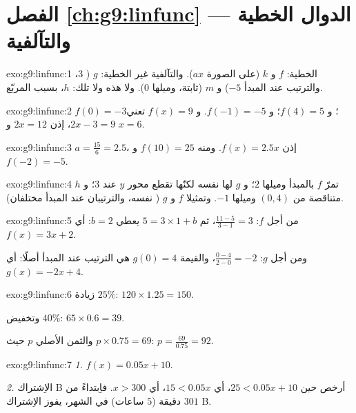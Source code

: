 \section*{الفصل \ref{ch:g9:linfunc} --- الدوال الخطية والتآلفية}

\begin{solution}{exo:g9:linfunc:1}
الخطية: $f$ و $k$ (على الصورة $ax$). والتآلفية غير الخطية: $g$
( $3$، والترتيب عند المبدأ $-5$) و $m$ (ثابتة،
وميلها $0$). ولا هذه ولا تلك: $h$، بسبب المربّع.
\end{solution}

\begin{solution}{exo:g9:linfunc:2}
$f(0) = -3$؛ و $f(4) = 5$؛ و $f(-1) = -5$. و $f(x) = 9$ تعني
$2x - 3 = 9$، إذن $2x = 12$ و $x = 6$.
\end{solution}

\begin{solution}{exo:g9:linfunc:3}
$a = \frac{15}{6} = 2.5$، إذن $f(x) = 2.5x$. ومنه $f(10) = 25$
و $f(-2) = -5$.
\end{solution}

\begin{solution}{exo:g9:linfunc:4}
تمرّ $f$ بالمبدأ وميلها $2$؛ و $g$ لها  نفسه لكنّها
تقطع محور $y$ عند $3$؛ و $h$ متناقصة من $(0, 4)$ وميلها
$-1$. وتمثيلا $f$ و $g$ \emph{} (
نفسه، والترتيبان عند المبدأ مختلفان).
\end{solution}

\begin{solution}{exo:g9:linfunc:5}
من أجل $f$:  $\frac{11 - 5}{3 - 1} = 3$، ثم
$5 = 3 \times 1 + b$ يعطي $b = 2$: أي $f(x) = 3x + 2$.

ومن أجل $g$:  $\frac{0 - 4}{2 - 0} = -2$، والقيمة $g(0) = 4$
هي الترتيب عند المبدأ أصلًا: أي $g(x) = -2x + 4$.
\end{solution}

\begin{solution}{exo:g9:linfunc:6}
زيادة $25\%$: $120 \times 1.25 = 150$.

وتخفيض $40\%$: $65 \times 0.6 = 39$.

والثمن الأصلي $p$ حيث $p \times 0.75 = 69$:
$p = \frac{69}{0.75} = 92$.
\end{solution}

\begin{solution}{exo:g9:linfunc:7}
\emph{1.} $f(x) = 0.05x + 10$.

\emph{2.} الاِشتراك B أرخص حين $25 < 0.05x + 10$، أي
$15 < 0.05x$، أي $x > 300$. فاِبتداءً من $301$ دقيقة ($5$ ساعات)
في الشهر، يفوز الاِشتراك B.
\end{solution}

